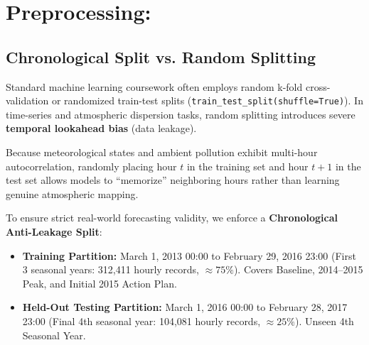 \documentclass[a4paper,12pt,twocolumn]{article}
\begin{document}
\section{Preprocessing:}
\label{sec:preprocess}

\subsection{Chronological Split vs. Random Splitting}
Standard machine learning coursework often employs random k-fold cross-validation or randomized train-test splits (\texttt{train\_test\_split(shuffle=True)}). In time-series and atmospheric dispersion tasks, random splitting introduces severe \textbf{temporal lookahead bias} (data leakage).

Because meteorological states and ambient pollution exhibit multi-hour autocorrelation, randomly placing hour $t$ in the training set and hour $t+1$ in the test set allows models to ``memorize'' neighboring hours rather than learning genuine atmospheric mapping.

To ensure strict real-world forecasting validity, we enforce a \textbf{Chronological Anti-Leakage Split}:
\begin{itemize}
    \item \textbf{Training Partition:} March 1, 2013 00:00 to February 29, 2016 23:00 (First 3 seasonal years: 312,411 hourly records, $\approx 75\%$). Covers Baseline, 2014--2015 Peak, and Initial 2015 Action Plan.
    \item \textbf{Held-Out Testing Partition:} March 1, 2016 00:00 to February 28, 2017 23:00 (Final 4th seasonal year: 104,081 hourly records, $\approx 25\%$). Unseen 4th Seasonal Year.
\end{itemize}
\end{document}
